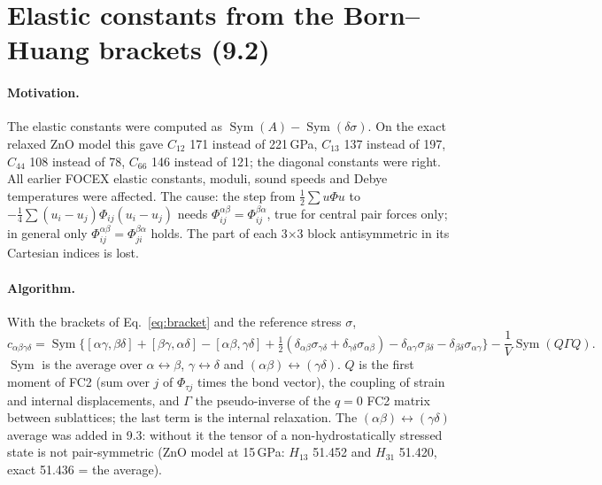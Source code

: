 \documentclass[11pt,a4paper]{article}
\newcommand{\Sym}{\operatorname{Sym}}
\begin{document}
\section{Elastic constants from the Born--Huang brackets (9.2)}\label{sec:elastic}
\paragraph{Motivation.} The elastic constants were computed as $\Sym(A)-\Sym(\delta\sigma)$. On the exact
relaxed ZnO model this gave $C_{12}$ 171 instead of 221\,GPa, $C_{13}$ 137 instead of 197, $C_{44}$ 108
instead of 78, $C_{66}$ 146 instead of 121; the diagonal constants were right. All earlier FOCEX elastic
constants, moduli, sound speeds and Debye temperatures were affected. The cause: the step from
$\tfrac12\sum u\Phi u$ to $-\tfrac14\sum(u_i-u_j)\Phi_{ij}(u_i-u_j)$ needs
$\Phi^{\alpha\beta}_{ij}=\Phi^{\beta\alpha}_{ij}$, true for central pair forces only; in general only
$\Phi^{\alpha\beta}_{ij}=\Phi^{\beta\alpha}_{ji}$ holds. The part of each 3$\times$3 block antisymmetric in
its Cartesian indices is lost.

\paragraph{Algorithm.} With the brackets of Eq.~\eqref{eq:bracket} and the reference stress $\sigma$,
\begin{equation}
c_{\alpha\beta\gamma\delta}=\Sym\Big\{[\alpha\gamma,\beta\delta]+[\beta\gamma,\alpha\delta]-[\alpha\beta,\gamma\delta]
+\tfrac12(\delta_{\alpha\beta}\sigma_{\gamma\delta}+\delta_{\gamma\delta}\sigma_{\alpha\beta})
-\delta_{\alpha\gamma}\sigma_{\beta\delta}-\delta_{\beta\delta}\sigma_{\alpha\gamma}\Big\}
-\frac1V\Sym(Q\Gamma Q).
\end{equation}
$\Sym$ is the average over $\alpha\leftrightarrow\beta$, $\gamma\leftrightarrow\delta$ and
$(\alpha\beta)\leftrightarrow(\gamma\delta)$. $Q$ is the first moment of FC2 (sum over $j$ of
$\Phi_{\tau j}$ times the bond vector), the coupling of strain and internal displacements, and $\Gamma$ the
pseudo-inverse of the $q=0$ FC2 matrix between sublattices; the last term is the internal relaxation. The
$(\alpha\beta)\leftrightarrow(\gamma\delta)$ average was added in 9.3: without it the tensor of a
non-hydrostatically stressed state is not pair-symmetric (ZnO model at 15\,GPa: $H_{13}$ 51.452 and
$H_{31}$ 51.420, exact 51.436 = the average).
\end{document}
